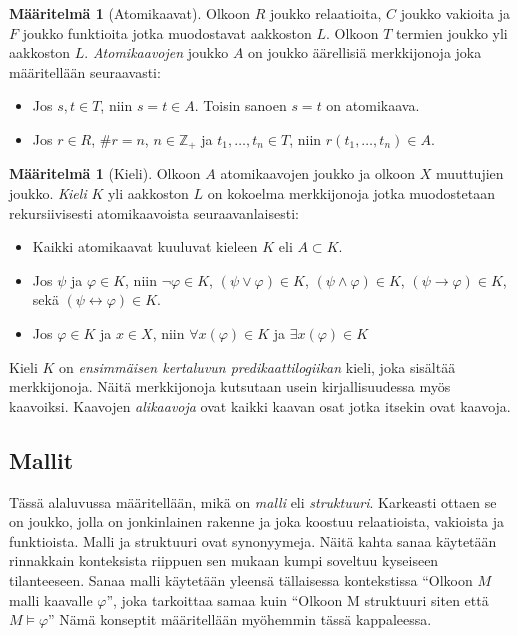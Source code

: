 \documentclass[finnish]{tktltiki2}
\theoremstyle{definition}
\newtheorem{maar}[lau]{Määritelmä}
\theoremstyle{remark}
\begin{document}
\begin{maar}[Atomikaavat]
Olkoon $R$ joukko relaatioita, $C$ joukko vakioita ja $F$ joukko funktioita jotka muodostavat aakkoston $L$. Olkoon $T$ termien joukko yli aakkoston $L$. \textit{Atomikaavojen} joukko $A$ on joukko äärellisiä merkkijonoja joka määritellään seuraavasti:
\begin{itemize}
\item Jos $s, t \in T$, niin $s = t \in A$. Toisin sanoen $s = t$ on atomikaava.
\item Jos $r \in R$, $\#r = n$, $n\in \mathbb{Z}_+$ ja $t_1, \ldots, t_n \in T$, niin $r(t_1, \ldots, t_n) \in A$.
\end{itemize}
\end{maar}

\begin{maar}[Kieli]
Olkoon $A$ atomikaavojen joukko ja olkoon $X$ muuttujien joukko. \textit{Kieli} $K$ yli aakkoston $L$ on kokoelma merkkijonoja jotka muodostetaan rekursiivisesti atomikaavoista seuraavanlaisesti:
\begin{itemize}
\item Kaikki atomikaavat kuuluvat kieleen $K$ eli $A \subset K$.
\item Jos $\psi$ ja $\varphi \in K$, niin $\neg \varphi \in K$, $(\psi \lor \varphi) \in K$, $(\psi \land \varphi) \in K$, $(\psi \to \varphi) \in K$, sekä $(\psi \leftrightarrow \varphi) \in K$.
\item Jos $\varphi \in K$ ja $x \in X$, niin $\forall x(\varphi) \in K$ ja $\exists x(\varphi) \in K$
\end{itemize}
\end{maar}
Kieli $K$ on \textit{ensimmäisen kertaluvun predikaattilogiikan} kieli, joka sisältää merkkijonoja. Näitä merkkijonoja kutsutaan usein kirjallisuudessa myös kaavoiksi. Kaavojen \textit{alikaavoja} ovat kaikki kaavan osat jotka itsekin ovat kaavoja. 

\subsection{Mallit}
Tässä alaluvussa määritellään, mikä on \textit{malli} eli \textit{struktuuri}. Karkeasti ottaen se on joukko, jolla on jonkinlainen rakenne ja joka koostuu relaatioista, vakioista ja funktioista. Malli ja struktuuri ovat synonyymeja. Näitä kahta sanaa käytetään rinnakkain konteksista riippuen sen mukaan kumpi soveltuu kyseiseen tilanteeseen. Sanaa malli käytetään yleensä tällaisessa kontekstissa ``Olkoon $M$ malli kaavalle $\varphi$'', joka tarkoittaa samaa kuin ``Olkoon M struktuuri siten että $M \models \varphi$'' Nämä konseptit määritellään myöhemmin tässä kappaleessa.
\end{document}
